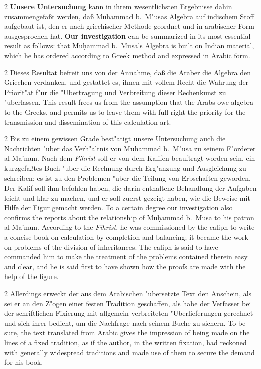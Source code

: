 \documentclass[10pt,a4paper]{article}
\renewcommand{\switchcolumn}{\syncronize\nointerlineskip\columnbreak}
\begin{document}
\begin{paracol}{2}
\textbf{Unsere Untersuchung} kann in ihrem wesentlichsten Ergebnisse dahin zusammengefa\ss{}t werden, da\ss{} Muhammad b.\ M"us\=as Algebra auf indischem Stoff aufgebaut ist, den er nach griechischer Methode geordnet und in arabischer Form ausgesprochen hat.
\switchcolumn
\textbf{Our investigation} can be summarized in its most essential result as follows: that Mu\d{h}ammad b.\ M\=us\=a's Algebra is built on Indian material, which he has ordered according to Greek method and expressed in Arabic form.
\end{paracol}

\begin{paracol}{2}
Dieses Resultat befreit uns von der Annahme, da\ss{} die Araber die Algebra den Griechen verdanken, und gestattet es, ihnen mit vollem Recht die Wahrung der Priorit"at f"ur die "Ubertragung und Verbreitung dieser Rechenkunst zu "uberlassen.
\switchcolumn
This result frees us from the assumption that the Arabs owe algebra to the Greeks, and permits us to leave them with full right the priority for the transmission and dissemination of this calculation art.
\end{paracol}

\begin{paracol}{2}
Bis zu einem gewissen Grade best"atigt unsere Untersuchung auch die Nachrichten "uber das Verh"altnis von Muhammad b.\ M"us\=a zu seinem F"orderer al-Ma'mun. Nach dem \textit{Fihrist} soll er von dem Kalifen beauftragt worden sein, ein kurzgefa\ss{}tes Buch "uber die Rechnung durch Erg"anzung und Ausgleichung zu schreiben; es ist zu den Problemen "uber die Teilung von Erbschaften geworden. Der Kalif soll ihm befohlen haben, die darin enthaltene Behandlung der Aufgaben leicht und klar zu machen, und er soll zuerst gezeigt haben, wie die Beweise mit Hilfe der Figur gemacht werden.
\switchcolumn
To a certain degree our investigation also confirms the reports about the relationship of Mu\d{h}ammad b.\ M\=us\=a to his patron al-Ma'mun. According to the \textit{Fihrist}, he was commissioned by the caliph to write a concise book on calculation by completion and balancing; it became the work on problems of the division of inheritances. The caliph is said to have commanded him to make the treatment of the problems contained therein easy and clear, and he is said first to have shown how the proofs are made with the help of the figure.
\end{paracol}

\begin{paracol}{2}
Allerdings erweckt der aus dem Arabischen "ubersetzte Text den Anschein, als sei er an den Z"ogen einer festen Tradition geschaffen, als habe der Verfasser bei der schriftlichen Fixierung mit allgemein verbreiteten "Uberlieferungen gerechnet und sich ihrer bedient, um die Nachfrage nach seinem Buche zu sichern.
\switchcolumn
To be sure, the text translated from Arabic gives the impression of being made on the lines of a fixed tradition, as if the author, in the written fixation, had reckoned with generally widespread traditions and made use of them to secure the demand for his book.
\end{paracol}
\end{document}
